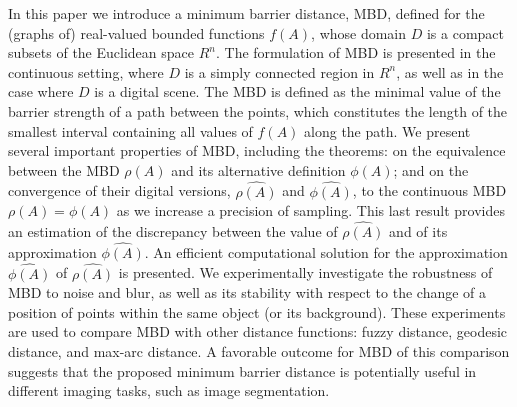 {{\begin{enumerate}
In this paper we introduce a minimum barrier distance, MBD, defined for the (graphs of) real-valued bounded functions $f(A)$, whose domain $D$ is a compact subsets of the Euclidean space $R^n$. The formulation of MBD is presented in the continuous setting, where $D$ is a simply connected region in $R^n$, as well as in the case where $D$ is a digital scene. The MBD is defined as the minimal value of the barrier strength of a path between the points, which constitutes the length of the smallest interval containing all values of $f(A)$ along the path. We present several important properties of MBD, including the theorems: on the equivalence between the MBD $\rho(A)$ and its alternative definition $\phi(A)$; and on the convergence of their digital versions, $\widehat{\rho (A)}$ and $\widehat{\phi (A)}$, to the continuous MBD $\rho(A) = \phi(A)$ as we increase a precision of sampling. This last result provides an estimation of the discrepancy between the value of $\widehat{\rho (A)}$ and of its approximation $\widehat{\phi (A)}$. An efficient computational solution for the approximation $\widehat{\phi (A)}$ of $\widehat{\rho (A)}$ is presented. We experimentally investigate the robustness of MBD to noise and blur, as well as its stability with respect to the change of a position of points within the same object (or its background). These experiments are used to compare MBD with other distance functions: fuzzy distance, geodesic distance, and max-arc distance. A favorable outcome for MBD of this comparison suggests that the proposed minimum barrier distance is potentially useful in different imaging tasks, such as image segmentation. \vspace*{-1.3mm}
\\ \aabstract

\end{enumerate}}}
